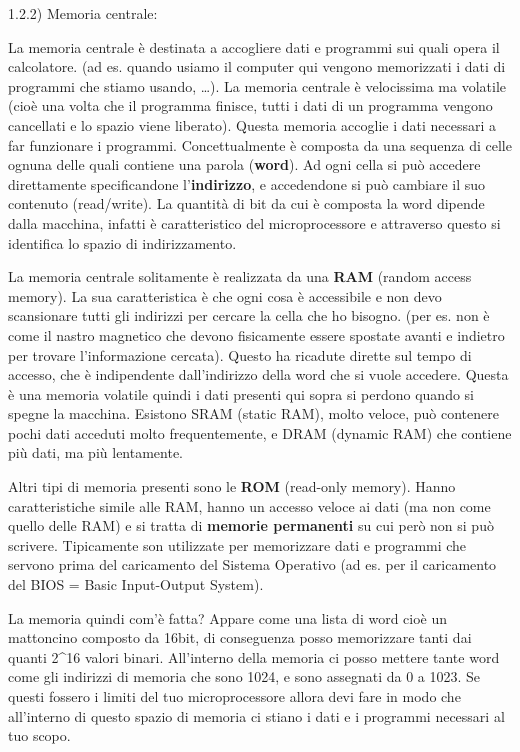 \documentclass[
  paper=a4,
  oneside  ,captions=tableheading
]{scrbook}
\begin{document}
1.2.2) Memoria centrale:

La memoria centrale è destinata a accogliere dati e programmi sui quali
opera il calcolatore. (ad es. quando usiamo il computer qui vengono
memorizzati i dati di programmi che stiamo usando, \ldots). La memoria
centrale è velocissima ma volatile (cioè una volta che il programma
finisce, tutti i dati di un programma vengono cancellati e lo spazio
viene liberato). Questa memoria accoglie i dati necessari a far
funzionare i programmi. Concettualmente è composta da una sequenza di
celle ognuna delle quali contiene una parola (\textbf{word}). Ad ogni
cella si può accedere direttamente specificandone l'\textbf{indirizzo},
e accedendone si può cambiare il suo contenuto (read/write). La quantità
di bit da cui è composta la word dipende dalla macchina, infatti è
caratteristico del microprocessore e attraverso questo si identifica lo
spazio di indirizzamento.

La memoria centrale solitamente è realizzata da una \textbf{RAM} (random
access memory). La sua caratteristica è che ogni cosa è accessibile e
non devo scansionare tutti gli indirizzi per cercare la cella che ho
bisogno. (per es. non è come il nastro magnetico che devono fisicamente
essere spostate avanti e indietro per trovare l'informazione cercata).
Questo ha ricadute dirette sul tempo di accesso, che è indipendente
dall'indirizzo della word che si vuole accedere. Questa è una memoria
volatile quindi i dati presenti qui sopra si perdono quando si spegne la
macchina. Esistono SRAM (static RAM), molto veloce, può contenere pochi
dati acceduti molto frequentemente, e DRAM (dynamic RAM) che contiene
più dati, ma più lentamente.

Altri tipi di memoria presenti sono le \textbf{ROM} (read-only memory).
Hanno caratteristiche simile alle RAM, hanno un accesso veloce ai dati
(ma non come quello delle RAM) e si tratta di \textbf{memorie
permanenti} su cui però non si può scrivere. Tipicamente son utilizzate
per memorizzare dati e programmi che servono prima del caricamento del
Sistema Operativo (ad es. per il caricamento del BIOS = Basic
Input-Output System).

La memoria quindi com'è fatta? Appare come una lista di word cioè un
mattoncino composto da 16bit, di conseguenza posso memorizzare tanti dai
quanti 2\^{}16 valori binari. All'interno della memoria ci posso mettere
tante word come gli indirizzi di memoria che sono 1024, e sono assegnati
da 0 a 1023. Se questi fossero i limiti del tuo microprocessore allora
devi fare in modo che all'interno di questo spazio di memoria ci stiano
i dati e i programmi necessari al tuo scopo.
\end{document}
